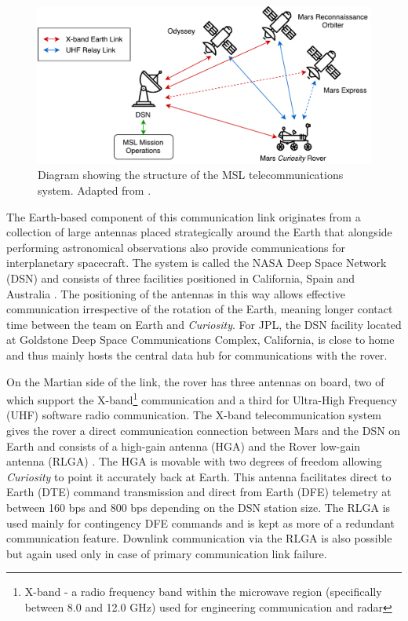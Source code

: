         \begin{figure}[h]
          \centering
          \includegraphics[width=0.71\linewidth]{figures/litreview-telecomsStructure}
          \caption[Diagram showing the structure of the MSL telecommunications system.]{Diagram showing the structure of the MSL telecommunications system. Adapted from \cite{fig:litreview-telecomsstructure_cite}.}
          \label{fig:litreview-telecomsstructure}
        \end{figure}

        
        The Earth-based component of this communication link originates from a collection of large antennas placed strategically around the Earth that alongside performing astronomical observations also provide communications for interplanetary spacecraft. The system is called the NASA Deep Space Network (DSN) and consists of three facilities positioned in California, Spain and Australia \cite{jpldsnabout}. The positioning of the antennas in this way allows effective communication irrespective of the rotation of the Earth, meaning longer contact time between the team on Earth and \textit{Curiosity}. For JPL, the DSN facility located at Goldstone Deep Space Communications Complex, California, is close to home and thus mainly hosts the central data hub for communications with the rover.
        
        On the Martian side of the link, the rover has three antennas on board, two of which support the X-band\footnote{X-band - a radio frequency band within the microwave region (specifically between 8.0 and 12.0 GHz) used for engineering communication and radar} communication and a third for Ultra-High Frequency (UHF) software radio communication. The X-band telecommunication system gives the rover a direct communication connection between Mars and the DSN on Earth and consists of a high-gain antenna (HGA) and the Rover low-gain antenna (RLGA) \cite{jpltelecom}. The HGA is movable with two degrees of freedom allowing \textit{Curiosity} to point it accurately back at Earth. This antenna facilitates direct to Earth (DTE) command transmission and direct from Earth (DFE) telemetry at between 160 bps and 800 bps depending on the DSN station size. The RLGA is used mainly for contingency DFE commands and is kept as more of a redundant communication feature. Downlink communication via the RLGA is also possible but again used only in case of primary communication link failure.
        
